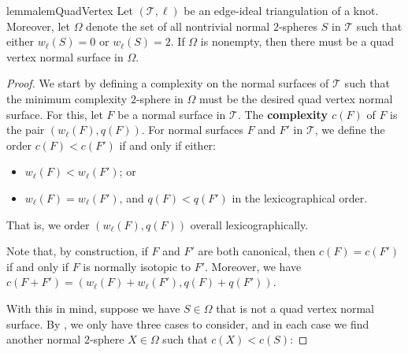 \documentclass[10pt,a4paper]{amsart}
\newcommand{\tri}{\mathcal{T}}
\begin{document}
\begin{restatable}{lemma}{lemQuadVertex}\label{lem:quadVertex}
Let $(\tri,\ell)$ be an edge-ideal triangulation of a knot.
Moreover, let $\Omega$ denote the set of all nontrivial normal $2$-spheres $S$ in $\tri$ such that either $w_\ell(S)=0$ or $w_\ell(S)=2$.
If $\Omega$ is nonempty, then there must be a quad vertex normal surface in $\Omega$.
\end{restatable}

\begin{proof}
We start by defining a complexity on the normal surfaces of $\tri$ such that the
minimum complexity $2$-sphere in $\Omega$ must be the desired quad vertex normal surface. For this, let $F$ be a normal surface in $\tri$. The \textbf{complexity $c(F)$} of $F$ is the pair $\left( w_\ell(F), q(F) \right)$. For normal surfaces $F$ and $F'$ in $\tri$, we define the order $c(F) < c(F')$ if and only if either:
\begin{itemize}
\item $w_\ell(F) < w_\ell(F')$; or
\item $w_\ell(F) = w_\ell(F')$, and $q(F) < q(F')$ in the lexicographical order.
\end{itemize}
That is, we order $\left( w_\ell(F), q(F) \right)$ overall lexicographically.

Note that, by construction, if $F$ and $F'$ are both canonical, then $c(F) = c(F')$ if and only if $F$ is normally isotopic to $F'$.
Moreover, we have $c(F+F') = \left( w_\ell(F) + w_\ell(F'), q(F) + q(F') \right)$.

With this in mind, suppose we have $S\in\Omega$ that is not a quad vertex normal surface.
By , we only have three cases to consider, and in each case we find another normal $2$-sphere $X\in\Omega$ such that $c(X)<c(S)$:


\end{proof}
\end{document}
